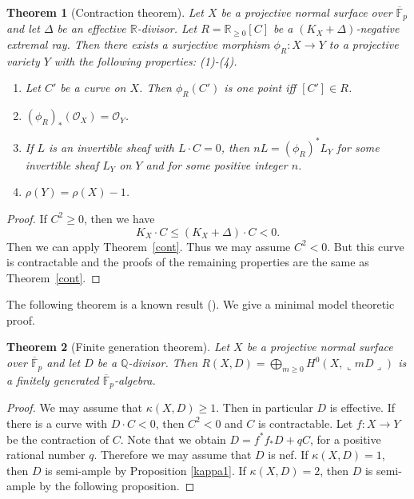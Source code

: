 \documentclass[12pt,twoside]{amsart}
\newtheorem{thm}{Theorem}[section]
\theoremstyle{definition}
\newcommand{\Q}{$\mathbb{Q}$}
\begin{document}
\begin{thm}[Contraction theorem]\label{fpcont}
Let $X$ be a projective normal surface over $\overline{\mathbb{F}}_p$ and 
let $\Delta$ be an effective $\mathbb{R}$-divisor. 
Let $R=\mathbb{R}_{\geq 0}[C]$ be a $(K_X+\Delta)$-negative extremal ray. 
Then there exists a surjective morphism $\phi_R: X \to Y$ 
to a projective variety $Y$ with the following properties{\em{:}} 
{\em{(1)-(4)}}.
\begin{enumerate}
\item{Let $C'$ be a curve on $X$. 
Then $\phi_R(C')$ is one point iff $[C'] \in R$.}
\item{$(\phi_R)_*(\mathcal{O}_X)=\mathcal{O}_Y$.}
\item{If $L$ is an invertible sheaf with $L\cdot C=0$, 
then $nL=(\phi_R)^*L_Y$ for some invertible sheaf $L_Y$ on $Y$ and 
for some positive integer $n$.}
\item{$\rho(Y)=\rho(X)-1$.}
\end{enumerate}
\end{thm}

\begin{proof}
If $C^2\geq 0$, then we have
$$K_X\cdot C \leq (K_X+\Delta)\cdot C<0.$$
Then we can apply Theorem~\ref{cont}. 
Thus we may assume $C^2<0$. 
But this curve is contractable and 
the proofs of the remaining properties are the same as Theorem~\ref{cont}. 
\end{proof}


The following theorem is a known result (\cite[Corollary~14.29]{Badescu}). 
We give a minimal model theoretic proof. 

\begin{thm}[Finite generation theorem]
Let $X$ be a projective normal surface over $\overline{\mathbb{F}}_p$ and 
let $D$ be a \Q-divisor. 
Then $R(X, D)=\bigoplus\limits_{m \geq 0} H^0(X, \llcorner mD\lrcorner)$
is a finitely generated $\overline{\mathbb{F}}_p$-algebra. 
\end{thm}

\begin{proof}
We may assume that $\kappa(X, D) \geq 1$. 
Then in particular $D$ is effective. 
If there is a curve with $D\cdot C<0$, then $C^2<0$ and $C$ is contractable. 
Let $f:X\to Y$ be the contraction of $C$. 
Note that we obtain 
$D=f^*f_*D+qC$, for a positive rational number $q$. 
Therefore we may assume that $D$ is nef. 
If $\kappa(X, D)=1$, then $D$ is semi-ample by Proposition \ref{kappa1}.
If $\kappa(X, D)=2$, then $D$ is semi-ample by the following proposition.
\end{proof}
\end{document}
